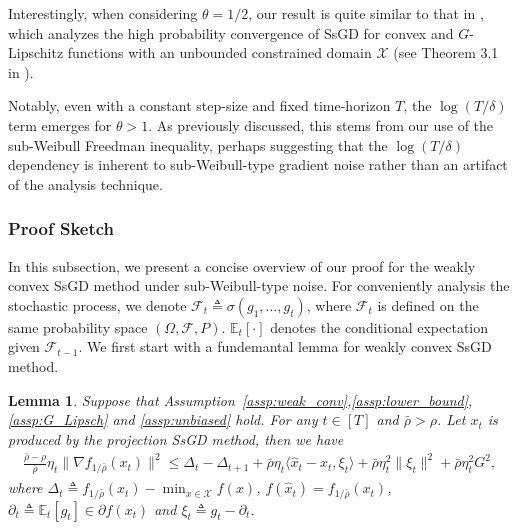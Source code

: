 \documentclass{article}
\newtheorem{lemma}{Lemma}
\def \E {\mathbb{E}}
\def \X {\mathcal{X}}
\begin{document}
Interestingly, when considering $\theta = 1/2$, our result is quite similar to that in \citep{liuzijian_2023}, which analyzes the high probability convergence of  SsGD for convex and $G$-Lipschitz functions with an unbounded constrained domain $\X$ (see Theorem 3.1 in \citep{liuzijian_2023}). 

Notably, even with a constant step-size and fixed time-horizon $T$, the $\log(T/\delta)$ term emerges for $\theta > 1$. As previously discussed, this stems from our use of the sub-Weibull Freedman inequality, perhaps suggesting that the $\log(T/\delta)$ dependency is inherent to sub-Weibull-type gradient noise rather than an artifact of the analysis technique.

\subsubsection{Proof Sketch} 
In this subsection, we present a concise overview of our proof for the weakly convex SsGD method under sub-Weibull-type noise. For conveniently analysis the stochastic process, we denote $\mathcal{F}_t\triangleq \sigma\left(g_1,\dots,g_{t}\right)$, where $\mathcal{F}_t$ is defined on the same probability space $(\Omega,\mathcal{F},P)$. $\E_t[\cdot]$ denotes the conditional expectation given $\mathcal{F}_{t-1}$. We first start with a fundemantal lemma for weakly convex SsGD method.
\begin{lemma}\label{lem: fundemantal_lem}
    Suppose that Assumption~\ref{assp:weak_conv},\ref{assp:lower_bound}, \ref{assp:G_Lipsch} and \ref{assp:unbiased} hold. For any $t\in[T]$ and $\bar{\rho}>\rho$. Let $x_t$ is produced by the projection SsGD method, then we have
    \begin{align}\label{eq:fundemantal_eq}
        \frac{\bar{\rho}-\rho}{\bar{\rho}}\eta_t\|\nabla f_{1/\bar{\rho}}(x_t)\|^2\leq \Delta_t-\Delta_{t+1} + \bar{\rho}\eta_t\langle \hat{x}_t-x_t, \xi_t\rangle + \bar{\rho}\eta_t^2\|\xi_t\|^2 + \bar{\rho}\eta_t^2G^2,
    \end{align}
    where $\Delta_t\triangleq f_{1/\bar{\rho}}(x_t)-\min_{x\in\X} f(x)$, $f(\hat{x}_t) = f_{1/\bar{\rho}}(x_t)$, $\partial_t\triangleq\E_t[g_t]\in\partial f(x_t)$ and $\xi_t\triangleq g_t-\partial_t$.
\end{lemma}
\end{document}
